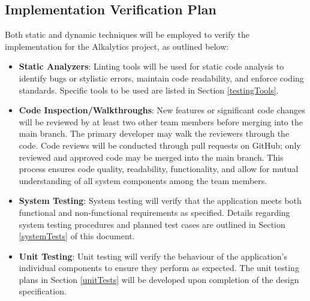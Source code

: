 \documentclass[12pt, titlepage]{article}
\begin{document}
\subsection{Implementation Verification Plan}
Both static and dynamic techniques will be employed to verify the implementation
for the Alkalytics project, as outlined below:
\begin{itemize}
  \item \textbf{Static Analyzers}: Linting tools will be used for static code
  analysis to identify bugs or stylistic errors, maintain code readability, and
  enforce coding standards. Specific tools to be used are listed in Section
  \ref{testingTools}.
  \item \textbf{Code Inspection/Walkthroughs}: New features or significant
  code changes will be reviewed by at least two other team members before
  merging into the main branch. The primary developer may walk the reviewers
  through the code. Code reviews will be conducted through pull requests on
  GitHub; only reviewed and approved code may be merged into the main branch.
  This process ensures code quality, readability, functionality, and allow for
  mutual understanding of all system components among the team members.
  \item \textbf{System Testing}: System testing will verify that the application
  meets both functional and non-functional requirements as specified. Details
  regarding system testing procedures and planned test cases are outlined in Section
  \ref{systemTests} of this document.
  \item \textbf{Unit Testing}: Unit testing will verify the behaviour of the
  application's individual components to ensure they perform as expected.
  The unit testing plans in Section \ref{unitTests} will be developed upon
  completion of the design specification.
\end{itemize}
\end{document}
